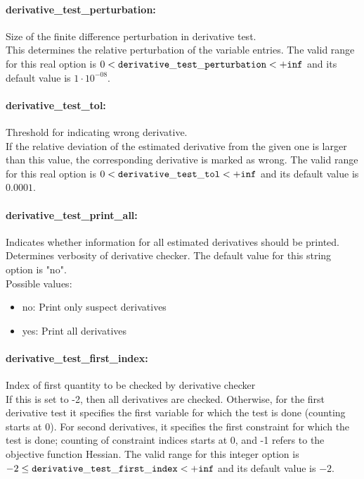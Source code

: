 \paragraph{derivative\_test\_perturbation:}\label{opt:derivative_test_perturbation} Size of the finite difference perturbation in derivative test. \\
 This determines the relative perturbation of the variable entries. The valid range for this real option is 
$0 <  {\tt derivative\_test\_perturbation } <  {\tt +inf}$
and its default value is $1 \cdot 10^{-08}$.


\paragraph{derivative\_test\_tol:}\label{opt:derivative_test_tol} Threshold for indicating wrong derivative. \\
 If the relative deviation of the estimated derivative from the given one is larger than this value, the corresponding derivative is marked as wrong. The valid range for this real option is 
$0 <  {\tt derivative\_test\_tol } <  {\tt +inf}$
and its default value is $0.0001$.


\paragraph{derivative\_test\_print\_all:}\label{opt:derivative_test_print_all} Indicates whether information for all estimated derivatives should be printed. \\
 Determines verbosity of derivative checker. The default value for this string option is "no".
\\ 
Possible values:
\begin{itemize}
   \item no: Print only suspect derivatives
   \item yes: Print all derivatives
\end{itemize}

\paragraph{derivative\_test\_first\_index:}\label{opt:derivative_test_first_index} Index of first quantity to be checked by derivative checker \\
 If this is set to -2, then all derivatives are checked.  Otherwise, for the first derivative test it specifies the first variable for which the test is done (counting starts at 0).  For second derivatives, it specifies the first constraint for which the test is done; counting of constraint indices starts at 0, and -1 refers to the objective function Hessian. The valid range for this integer option is
$-2 \le {\tt derivative\_test\_first\_index } <  {\tt +inf}$
and its default value is $-2$.


